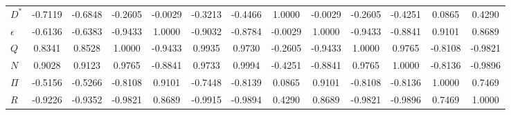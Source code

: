 \begin{center}
\begin{longtable}{lcccccccccccc}
$D^{*}      $	 & 	     -0.7119	 & 	     -0.6848	 & 	     -0.2605	 & 	     -0.0029	 & 	     -0.3213	 & 	     -0.4466	 & 	      1.0000	 & 	     -0.0029	 & 	     -0.2605	 & 	     -0.4251	 & 	      0.0865	 & 	      0.4290 \\ 
$\epsilon   $	 & 	     -0.6136	 & 	     -0.6383	 & 	     -0.9433	 & 	      1.0000	 & 	     -0.9032	 & 	     -0.8784	 & 	     -0.0029	 & 	      1.0000	 & 	     -0.9433	 & 	     -0.8841	 & 	      0.9101	 & 	      0.8689 \\ 
$Q          $	 & 	      0.8341	 & 	      0.8528	 & 	      1.0000	 & 	     -0.9433	 & 	      0.9935	 & 	      0.9730	 & 	     -0.2605	 & 	     -0.9433	 & 	      1.0000	 & 	      0.9765	 & 	     -0.8108	 & 	     -0.9821 \\ 
$N          $	 & 	      0.9028	 & 	      0.9123	 & 	      0.9765	 & 	     -0.8841	 & 	      0.9733	 & 	      0.9994	 & 	     -0.4251	 & 	     -0.8841	 & 	      0.9765	 & 	      1.0000	 & 	     -0.8136	 & 	     -0.9896 \\ 
$\Pi        $	 & 	     -0.5156	 & 	     -0.5266	 & 	     -0.8108	 & 	      0.9101	 & 	     -0.7448	 & 	     -0.8139	 & 	      0.0865	 & 	      0.9101	 & 	     -0.8108	 & 	     -0.8136	 & 	      1.0000	 & 	      0.7469 \\ 
$R          $	 & 	     -0.9226	 & 	     -0.9352	 & 	     -0.9821	 & 	      0.8689	 & 	     -0.9915	 & 	     -0.9894	 & 	      0.4290	 & 	      0.8689	 & 	     -0.9821	 & 	     -0.9896	 & 	      0.7469	 & 	      1.0000 \\ 
\end{longtable}
 \end{center}
